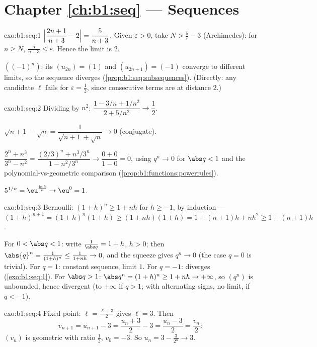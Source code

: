 \section*{Chapter \ref{ch:b1:seq} --- Sequences}

\begin{solution}{exo:b1:seq:1}
$\Bigl|\dfrac{2n+1}{n+3} - 2\Bigr| = \dfrac{5}{n+3}$. Given
$\varepsilon > 0$, take $N > \frac 5\varepsilon - 3$ (Archimedes):
for $n \geq N$, $\frac{5}{n+3} \leq \varepsilon$. Hence the limit is
$2$.

$((-1)^n)$: its  $(u_{2n}) = (1)$ and $(u_{2n+1}) =
(-1)$ converge to different limits, so the sequence diverges
(\cref{prop:b1:seq:subsequences}). (Directly: any candidate $\ell$
fails for $\varepsilon = \frac12$, since consecutive terms are at
distance $2$.)
\end{solution}

\begin{solution}{exo:b1:seq:2}
Dividing by $n^2$: $\dfrac{1 - 3/n + 1/n^2}{2 + 5/n^2} \to
\dfrac12$.

$\sqrt{n+1} - \sqrt n = \dfrac{1}{\sqrt{n+1} + \sqrt n} \to 0$
(conjugate).

$\dfrac{2^n + n^3}{3^n - n^2} = \dfrac{(2/3)^n + n^3/3^n}{1 -
n^2/3^n} \to \dfrac{0 + 0}{1 - 0} = 0$, using $q^n \to 0$ for $\abs q
< 1$ and the polynomial-vs-geometric comparison
(\cref{prop:b1:functions:powerrules}).

$5^{1/n} = \eu^{\frac{\ln 5}{n}} \to \eu^0 = 1$.
\end{solution}

\begin{solution}{exo:b1:seq:3}
Bernoulli: $(1+h)^n \geq 1 + nh$ for $h \geq -1$, by induction ---
$(1+h)^{n+1} = (1+h)^n(1+h) \geq (1+nh)(1+h) = 1 + (n+1)h + nh^2
\geq 1 + (n+1)h$.

For $0 < \abs q < 1$: write $\frac{1}{\abs q} = 1 + h$, $h > 0$; then
$\abs{q}^n = \frac{1}{(1+h)^n} \leq \frac{1}{1 + nh} \to 0$, and the
squeeze gives $q^n \to 0$ (the case $q = 0$ is trivial). For $q = 1$:
constant sequence, limit $1$. For $q = -1$: diverges
(\cref{exo:b1:seq:1}). For $\abs q > 1$: $\abs q^n = (1 + h)^n \geq
1 + nh \to +\infty$, so $(q^n)$ is unbounded, hence divergent (to
$+\infty$ if $q > 1$; with alternating signs, no limit, if $q <
-1$).
\end{solution}

\begin{solution}{exo:b1:seq:4}
Fixed point: $\ell = \frac{\ell + 3}{2}$ gives $\ell = 3$. Then
\[
v_{n+1} = u_{n+1} - 3 = \frac{u_n + 3}{2} - 3 = \frac{u_n - 3}{2} =
\frac{v_n}{2}:
\]
$(v_n)$ is geometric with ratio $\frac12$, $v_0 = -3$. So $u_n = 3 -
\frac{3}{2^n} \to 3$.
\end{solution}

